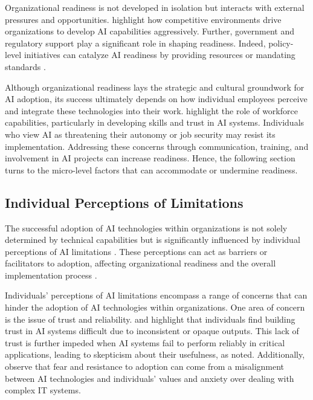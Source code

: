 Organizational readiness is not developed in isolation but interacts with external pressures and opportunities. \cite{Yang2024} highlight how competitive environments drive organizations to develop AI capabilities aggressively. Further, government and regulatory support play a significant role in shaping readiness. Indeed, policy-level initiatives can catalyze AI readiness by providing resources or mandating standards \citep{Felemban2024}.

Although organizational readiness lays the strategic and cultural groundwork for AI adoption, its success ultimately depends on how individual employees perceive and integrate these technologies into their work. \cite{Johnk2021} highlight the role of workforce capabilities, particularly in developing skills and trust in AI systems. Individuals who view AI as threatening their autonomy or job security may resist its implementation. Addressing these concerns through communication, training, and involvement in AI projects can increase readiness. Hence, the following section turns to the micro-level factors that can accommodate or undermine readiness.


\subsection{Individual Perceptions of Limitations}


The successful adoption of AI technologies within organizations is not solely determined by technical capabilities but is significantly influenced by individual perceptions of AI limitations \citep{Glikson2020,Kelley2022}. These perceptions can act as barriers or facilitators to adoption, affecting organizational readiness and the overall implementation process \citep{Trenerry2021}.

Individuals' perceptions of AI limitations encompass a range of concerns that can hinder the adoption of AI technologies within organizations. One area of concern is the issue of trust and reliability. \cite{Nasarian2024} and \cite{Xiangwei2022} highlight that individuals find building trust in AI systems difficult due to inconsistent or opaque outputs. This lack of trust is further impeded when AI systems fail to perform reliably in critical applications, leading to skepticism about their usefulness, as \cite{Singh2023} noted. Additionally, \cite{Choudhary2024} observe that fear and resistance to adoption can come from a misalignment between AI technologies and individuals' values and anxiety over dealing with complex IT systems.

